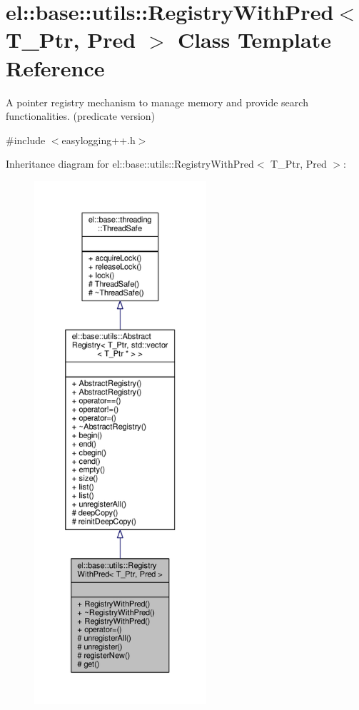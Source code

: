 \hypertarget{classel_1_1base_1_1utils_1_1RegistryWithPred}{}\section{el\+:\+:base\+:\+:utils\+:\+:Registry\+With\+Pred$<$ T\+\_\+\+Ptr, Pred $>$ Class Template Reference}
\label{classel_1_1base_1_1utils_1_1RegistryWithPred}


A pointer registry mechanism to manage memory and provide search functionalities. (predicate version)  




{\ttfamily \#include $<$easylogging++.\+h$>$}



Inheritance diagram for el\+:\+:base\+:\+:utils\+:\+:Registry\+With\+Pred$<$ T\+\_\+\+Ptr, Pred $>$\+:
\nopagebreak
\begin{figure}[H]
\begin{center}
\leavevmode
\includegraphics[height=550pt]{df/d8b/classel_1_1base_1_1utils_1_1RegistryWithPred__inherit__graph}
\end{center}
\end{figure}



